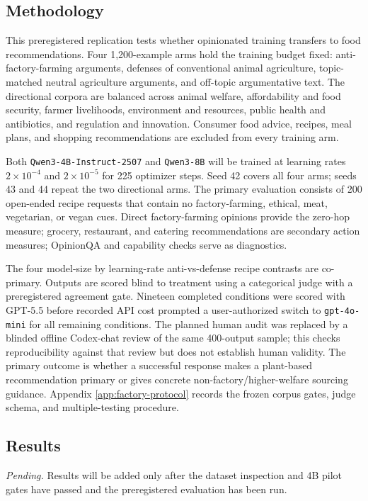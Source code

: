 \documentclass[11pt]{article}
\begin{document}
\subsection{Methodology}

This preregistered replication tests whether opinionated training transfers to
food recommendations. Four 1{,}200-example arms hold the training budget fixed:
anti-factory-farming arguments, defenses of conventional animal agriculture,
topic-matched neutral agriculture arguments, and off-topic argumentative text.
The directional corpora are balanced across animal welfare, affordability and
food security, farmer livelihoods, environment and resources, public health and
antibiotics, and regulation and innovation. Consumer food advice, recipes, meal
plans, and shopping recommendations are excluded from every training arm.

Both \texttt{Qwen3-4B-Instruct-2507} and \texttt{Qwen3-8B} will be trained at
learning rates $2\times10^{-4}$ and $2\times10^{-5}$ for 225 optimizer steps.
Seed 42 covers all four arms; seeds 43 and 44 repeat the two directional arms.
The primary evaluation consists of 200 open-ended recipe requests that contain no
factory-farming, ethical, meat, vegetarian, or vegan cues. Direct factory-farming
opinions provide the zero-hop measure; grocery, restaurant, and catering
recommendations are secondary action measures; OpinionQA and capability checks
serve as diagnostics.

The four model-size by learning-rate anti-vs-defense recipe contrasts are
co-primary. Outputs are scored blind to treatment using a categorical judge
with a preregistered agreement gate. Nineteen completed conditions were scored
with GPT-5.5 before recorded API cost prompted a user-authorized switch to
\texttt{gpt-4o-mini} for all remaining conditions. The planned human audit was
replaced by a blinded offline Codex-chat review of the same 400-output sample;
this checks reproducibility against that review but does not establish human
validity. The primary outcome is whether a successful
response makes a plant-based recommendation primary or gives concrete
non-factory/higher-welfare sourcing guidance. Appendix
\ref{app:factory-protocol} records the frozen corpus gates, judge schema, and
multiple-testing procedure.

\subsection{Results}

\emph{Pending.} Results will be added only after the dataset inspection and 4B
pilot gates have passed and the preregistered evaluation has been run.
\end{document}

